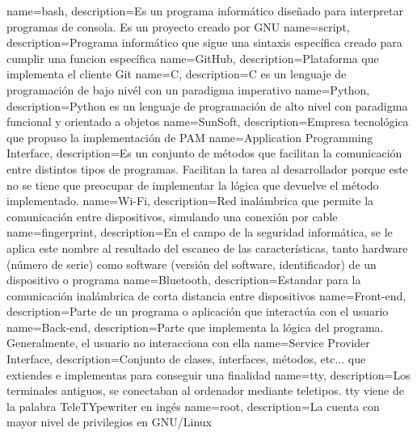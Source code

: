 {
	name=bash,
	description={Es un programa informático diseñado para interpretar programas de consola. Es un proyecto creado por GNU}
}
{
	name=script,
	description={Programa informático que sigue una sintaxis específica creado para cumplir una funcion específica}
}
{
	name=GitHub,
	description={Plataforma que implementa el cliente Git}
}
{
	name=C,
	description={C es un lenguaje de programación de bajo nivél con un paradigma imperativo}
}
{
	name=Python,
	description={Python es un lenguaje de programación de alto nivel con paradigma funcional y orientado a objetos}
}
{
	name=SunSoft,
	description={Empresa tecnológica que propuso la implementación de PAM}
}
{
	name=Application Programming Interface,
	description={Es un conjunto de métodos que facilitan la comunicación entre distintos tipos de programas. Facilitan la tarea al desarrollador porque este no se tiene que preocupar de implementar la lógica que devuelve el método implementado.}
}
{
	name=Wi-Fi,
	description={Red inalámbrica que permite la comunicación entre dispositivos, simulando una conexión por cable}
}
{
	name=fingerprint,
	description={En el campo de la seguridad informática, se le aplica este nombre al resultado del escaneo de las características, tanto hardware (número de serie) como software (versión del software, identificador) de un dispositivo o programa}
}
{
	name=Bluetooth,
	description={Estandar para la comunicación inalámbrica de corta distancia entre dispositivos}
}
{
	name=Front-end,
	description={Parte de un programa o aplicación que interactúa con el usuario}
}
{
	name=Back-end,
	description={Parte que implementa la lógica del programa. Generalmente, el usuario no interacciona con ella}
}
{
	name=Service Provider Interface,
	description={Conjunto de clases, interfaces, métodos, etc... que extiendes e implementas para conseguir una finalidad}
}
{
	name=tty,
	description={Los terminales antiguos, se conectaban al ordenador mediante teletipos. tty viene de la palabra TeleTYpewriter en ingés}
}
{
	name=root,
	description={La cuenta con mayor nivel de privilegios en GNU/Linux}
}
